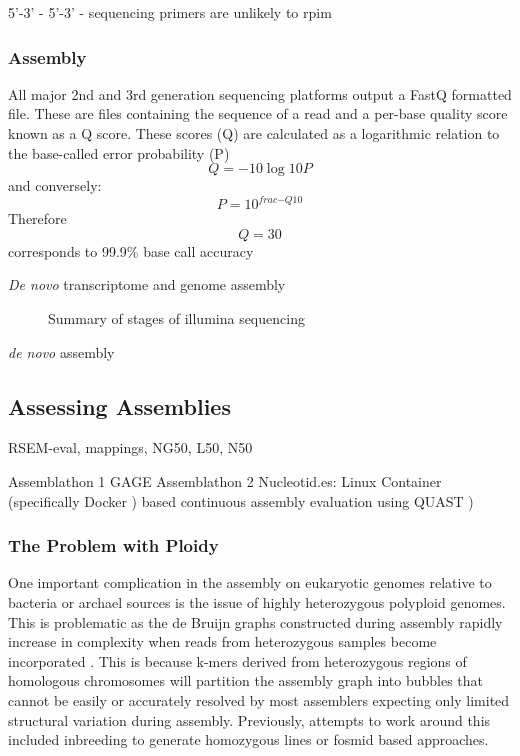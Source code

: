 5'-3' - 5'-3'  - sequencing primers are unlikely to rpim



\subsubsection{Assembly}

All major 2nd and 3rd generation sequencing platforms output a FastQ formatted file.
These are files containing the sequence of a read and a per-base quality score known as a Q score.
These scores (Q) are calculated as a logarithmic relation to the base-called error probability (P)
\[ Q = -10\log{10}{P} \]
and conversely: 
\[ P = 10^{frac{-Q}{10}} \]
Therefore \[Q = 30 \] corresponds to 99.9\% base call accuracy

\textit{De novo} transcriptome and genome assembly 



\begin{figure}
    Summary of stages of illumina sequencing
\end{figure}



\textit{de novo} assembly


\subsection{Assessing Assemblies}

RSEM-eval, mappings, NG50, L50, N50

Assemblathon 1 \citep{Earl2011}
GAGE \citep{Schatz2012}
Assemblathon 2 \citep{Bradnam2013}
Nucleotid.es: Linux Container (specifically Docker \citep{Merkel2014})  based continuous assembly evaluation using QUAST \citep{Gurevich2013a})


\subsubsection{The Problem with Ploidy}

One important complication in the assembly on eukaryotic genomes 
relative to bacteria or archael sources is the issue of highly heterozygous polyploid genomes.
This is problematic as the de Bruijn graphs constructed during assembly
rapidly increase in complexity when reads from heterozygous samples become
incorporated \citep{Kajitani2014}.  This is because k-mers derived from heterozygous regions of 
homologous chromosomes will partition the assembly graph into bubbles that cannot be easily 
or accurately resolved by most assemblers expecting only limited structural variation during
assembly.  Previously, attempts to work around this included inbreeding to generate
homozygous lines or fosmid based approaches.

